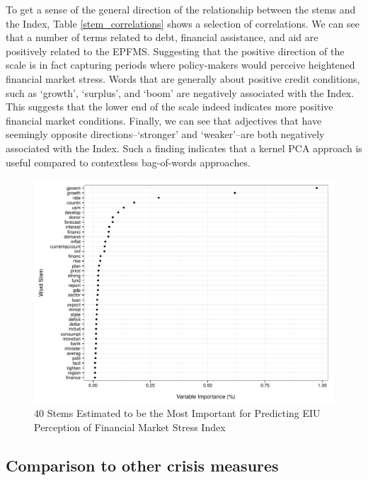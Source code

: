 \documentclass[]{article}
\begin{document}
To get a sense of the general direction of the relationship between the stems and the Index, Table \ref{stem_correlations} shows a selection of correlations. We can see that a number of terms related to debt, financial assistance, and aid are positively related to the EPFMS. Suggesting that the positive direction of the scale is in fact capturing periods where policy-makers would perceive heightened financial market stress. Words that are generally about positive credit conditions, such as `growth', `surplus', and `boom' are negatively associated with the Index. This suggests that the lower end of the scale indeed indicates more positive financial market conditions. Finally, we can see that adjectives that have seemingly opposite directions--`stronger' and `weaker'--are both negatively associated with the Index. Such a finding indicates that a kernel PCA approach is useful compared to contextless bag-of-words approaches.

\begin{figure}
    \caption{40 Stems Estimated to be the Most Important for Predicting EIU Perception of Financial Market Stress Index}
    \label{rf_importance}

    \begin{center}
        \includegraphics[scale=0.5]{analysis/figures/rf_stem_importance.pdf}
    \end{center}

\end{figure}



\subsection{Comparison to other crisis
measures}\label{comparison-to-other-crisis-measures}
\end{document}
